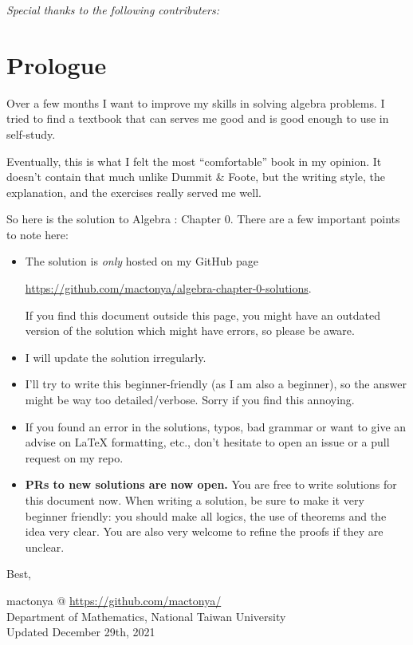 \thispagestyle{empty}
\begin{center}

\vspace{48pt}
\emph{Special thanks to the following contributers:}
\end{center}
    
\newpage

\chapter{Prologue}
Over a few months I want to improve my skills in solving algebra problems. I tried to find a textbook that can serves me good and is good enough to use in self-study. 

Eventually, this is what I felt the most ``comfortable'' book in my opinion. It doesn't contain that much unlike Dummit \& Foote, but the writing style, the explanation, and the exercises really served me well.

So here is the solution to Algebra : Chapter 0. There are a few important points to note here:
\begin{itemize}
	\item The solution is \emph{only} hosted on my GitHub page 
	\begin{center}
		\href{https://github.com/mactonya/algebra-chapter-0-solutions}{https://github.com/mactonya/algebra-chapter-0-solutions}.
	\end{center} 
	If you find this document outside this page, you might have an outdated version of the solution which might have errors, so please be aware.
    \item I will update the solution irregularly.
    \item I'll try to write this beginner-friendly (as I am also a beginner), so the answer might be way too detailed/verbose. Sorry if you find this annoying. 
    \item If you found an error in the solutions, typos, bad grammar or want to give an advise on LaTeX formatting, etc., don't hesitate to open an issue or a pull request on my repo. 
    \item \textbf{PRs to new solutions are now open.} You are free to write solutions for this document now. When writing a solution, be sure to make it very beginner friendly: you should make all logics, the use of theorems and the idea very clear. You are also very welcome to refine the proofs if they are unclear.

\end{itemize}

Best,

\begin{flushright}
mactonya @ \href{https://github.com/mactonya/}{https://github.com/mactonya/} \\
Department of Mathematics, National Taiwan University \\
Updated December 29th, 2021
\end{flushright}
